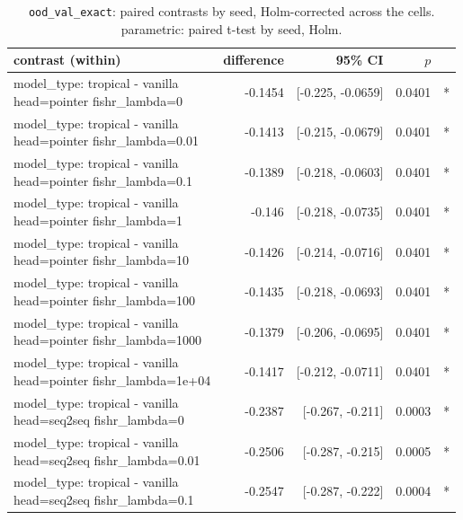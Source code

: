 \documentclass[10pt]{article}
\makeatletter
\newcommand{\stackcell}[1]{\begin{tabular}[t]{@{}l@{}}#1\end{tabular}}
\makeatother
\begin{document}
{\small
\begin{longtable}{lrrrl}
\caption{\texttt{ood\_val\_exact}: paired contrasts by seed, Holm-corrected across the cells. parametric: paired t-test by seed, Holm.}\label{tab:paired-ood_val_exact}\\
\toprule
contrast (within) & difference & 95\% CI & $p$ & \\
\midrule
\endhead
\stackcell{model\_type: tropical - vanilla\\\footnotesize head=pointer fishr\_lambda=0 } & -0.1454 & [-0.225, -0.0659] & 0.0401 & *\\
\stackcell{model\_type: tropical - vanilla\\\footnotesize head=pointer fishr\_lambda=0.01 } & -0.1413 & [-0.215, -0.0679] & 0.0401 & *\\
\stackcell{model\_type: tropical - vanilla\\\footnotesize head=pointer fishr\_lambda=0.1 } & -0.1389 & [-0.218, -0.0603] & 0.0401 & *\\
\stackcell{model\_type: tropical - vanilla\\\footnotesize head=pointer fishr\_lambda=1 } & -0.146 & [-0.218, -0.0735] & 0.0401 & *\\
\stackcell{model\_type: tropical - vanilla\\\footnotesize head=pointer fishr\_lambda=10 } & -0.1426 & [-0.214, -0.0716] & 0.0401 & *\\
\stackcell{model\_type: tropical - vanilla\\\footnotesize head=pointer fishr\_lambda=100 } & -0.1435 & [-0.218, -0.0693] & 0.0401 & *\\
\stackcell{model\_type: tropical - vanilla\\\footnotesize head=pointer fishr\_lambda=1000 } & -0.1379 & [-0.206, -0.0695] & 0.0401 & *\\
\stackcell{model\_type: tropical - vanilla\\\footnotesize head=pointer fishr\_lambda=1e+04 } & -0.1417 & [-0.212, -0.0711] & 0.0401 & *\\
\stackcell{model\_type: tropical - vanilla\\\footnotesize head=seq2seq fishr\_lambda=0 } & -0.2387 & [-0.267, -0.211] & 0.0003 & *\\
\stackcell{model\_type: tropical - vanilla\\\footnotesize head=seq2seq fishr\_lambda=0.01 } & -0.2506 & [-0.287, -0.215] & 0.0005 & *\\
\stackcell{model\_type: tropical - vanilla\\\footnotesize head=seq2seq fishr\_lambda=0.1 } & -0.2547 & [-0.287, -0.222] & 0.0004 & *\\

\end{longtable}}
\end{document}

